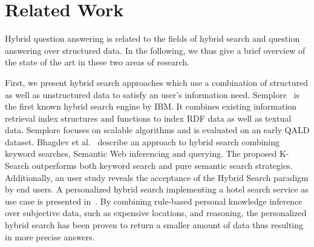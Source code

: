 \section{Related Work} 
\label{chahawk:sec:relatedwork}
Hybrid question answering is related to the fields of hybrid search and question answering over structured data. In the following, we thus give a brief overview of the state of the art in these two areas of research.

First, we present hybrid search approaches which use a combination of structured as well as unstructured data to satisfy an user's information need. 
Semplore~\cite{Zhang:2007a} is the first known hybrid search engine by IBM.
It combines existing information retrieval index structures and functions to index RDF data as well as textual data. 
Semplore focuses on scalable algorithms and is evaluated on an early QALD dataset.
Bhagdev et al.~\cite{Bhagdev:2008:HSE} describe an approach to hybrid search combining keyword searches, Semantic Web inferencing and querying. 
The proposed K-Search outperforms both keyword search and pure semantic search strategies.
Additionally, an user study reveals the acceptance of the Hybrid Search paradigm by end users.
A personalized hybrid search implementing a  hotel search service as use case is presented in~\cite{DBLP:journals/kbs/Yoo12}. 
By combining rule-based personal knowledge inference over subjective data, such as expensive locations, and reasoning, the personalized hybrid search has been proven to return a smaller amount of data thus resulting in more precise answers. 
